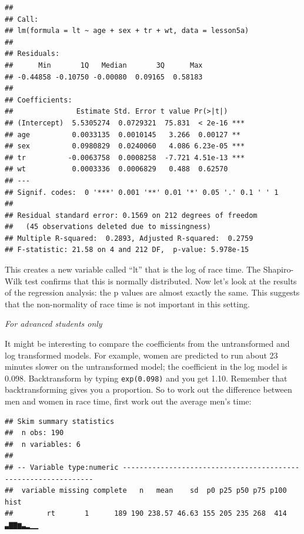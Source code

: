 \documentclass[]{book}
\newenvironment{Shaded}{\begin{snugshade}}{\end{snugshade}}
\newcommand{\CommentTok}[1]{\textcolor[rgb]{0.56,0.35,0.01}{\textit{#1}}}
\newcommand{\DecValTok}[1]{\textcolor[rgb]{0.00,0.00,0.81}{#1}}
\newcommand{\KeywordTok}[1]{\textcolor[rgb]{0.13,0.29,0.53}{\textbf{#1}}}
\newcommand{\NormalTok}[1]{#1}
\newcommand{\OperatorTok}[1]{\textcolor[rgb]{0.81,0.36,0.00}{\textbf{#1}}}
\newcommand{\StringTok}[1]{\textcolor[rgb]{0.31,0.60,0.02}{#1}}
\begin{document}
\begin{verbatim}
## 
## Call:
## lm(formula = lt ~ age + sex + tr + wt, data = lesson5a)
## 
## Residuals:
##      Min       1Q   Median       3Q      Max 
## -0.44858 -0.10750 -0.00080  0.09165  0.58183 
## 
## Coefficients:
##               Estimate Std. Error t value Pr(>|t|)    
## (Intercept)  5.5305274  0.0729321  75.831  < 2e-16 ***
## age          0.0033135  0.0010145   3.266  0.00127 ** 
## sex          0.0980829  0.0240060   4.086 6.23e-05 ***
## tr          -0.0063758  0.0008258  -7.721 4.51e-13 ***
## wt           0.0003336  0.0006829   0.488  0.62570    
## ---
## Signif. codes:  0 '***' 0.001 '**' 0.01 '*' 0.05 '.' 0.1 ' ' 1
## 
## Residual standard error: 0.1569 on 212 degrees of freedom
##   (45 observations deleted due to missingness)
## Multiple R-squared:  0.2893, Adjusted R-squared:  0.2759 
## F-statistic: 21.58 on 4 and 212 DF,  p-value: 5.978e-15
\end{verbatim}

This creates a new variable called ``lt'' that is the log of race time. The Shapiro-Wilk test confirms that this is normally distributed. Now let's look at the results of the regression analysis: the p values are almost exactly the same. This suggests that the non-normality of race time is not important in this setting.

\emph{For advanced students only}

It might be interesting to compare the coefficients from the untransformed and log transformed models. For example, women are predicted to run about 23 minutes slower on the untransformed model; the coefficient in the log model is 0.098. Backtransform by typing \texttt{exp(0.098)} and you get 1.10. Remember that backtransforming gives you a proportion. So to work out the difference between men and women in race time, first work out the average men's time:

\begin{Shaded}
\end{Shaded}

\begin{verbatim}
## Skim summary statistics
##  n obs: 190 
##  n variables: 6 
## 
## -- Variable type:numeric ---------------------------------------------------------------
##  variable missing complete   n   mean    sd  p0 p25 p50 p75 p100     hist
##        rt       1      189 190 238.57 46.63 155 205 235 268  414 ▃▇▇▆▃▂▁▁
\end{verbatim}
\end{document}
